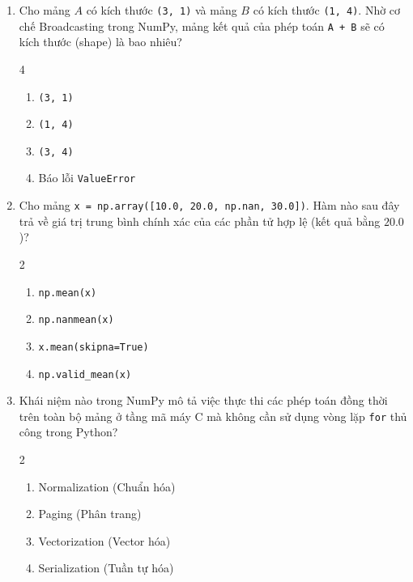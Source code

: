 \documentclass[11pt,a4paper]{article}
\begin{document}
\newpage
\begin{enumerate}[leftmargin=*,itemsep=2.5pt,resume]

\item Cho mảng $A$ có kích thước \texttt{(3, 1)} và mảng $B$ có kích thước \texttt{(1, 4)}. Nhờ cơ chế Broadcasting trong NumPy, mảng kết quả của phép toán \texttt{A + B} sẽ có kích thước (shape) là bao nhiêu?
\begin{multicols}{4}
\begin{enumerate}[label=\Alph*.]
  \item \texttt{(3, 1)}
  \item \texttt{(1, 4)}
  \item \texttt{(3, 4)}
  \item Báo lỗi \texttt{ValueError}
\end{enumerate}
\end{multicols}

\item Cho mảng \texttt{x = np.array([10.0, 20.0, np.nan, 30.0])}. Hàm nào sau đây trả về giá trị trung bình chính xác của các phần tử hợp lệ (kết quả bằng $20.0$)?
\begin{multicols}{2}
\begin{enumerate}[label=\Alph*.]
  \item \texttt{np.mean(x)}
  \item \texttt{np.nanmean(x)}
  \item \texttt{x.mean(skipna=True)}
  \item \texttt{np.valid\_mean(x)}
\end{enumerate}
\end{multicols}

\item Khái niệm nào trong NumPy mô tả việc thực thi các phép toán đồng thời trên toàn bộ mảng ở tầng mã máy C mà không cần sử dụng vòng lặp \texttt{for} thủ công trong Python?
\begin{multicols}{2}
\begin{enumerate}[label=\Alph*.]
  \item Normalization (Chuẩn hóa)
  \item Paging (Phân trang)
  \item Vectorization (Vector hóa)
  \item Serialization (Tuần tự hóa)
\end{enumerate}
\end{multicols}


\end{enumerate}
\end{document}
